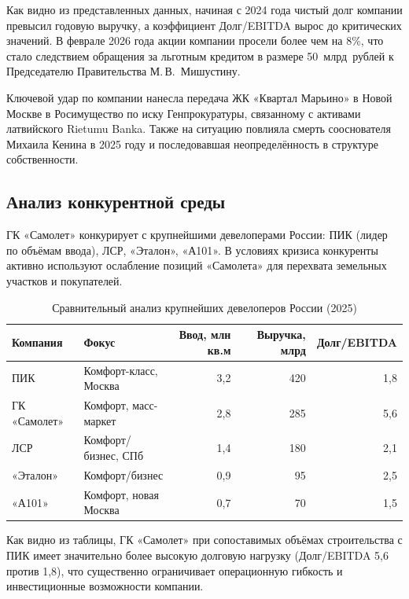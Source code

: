 \documentclass[12pt,a4paper]{article}
\begin{document}
Как видно из представленных данных, начиная с 2024 года чистый долг компании превысил годовую выручку, а коэффициент Долг/EBITDA вырос до критических значений. В феврале 2026 года акции компании просели более чем на 8\%, что стало следствием обращения за льготным кредитом в размере 50~млрд~рублей к Председателю Правительства М.\,В.~Мишустину.

Ключевой удар по компании нанесла передача ЖК «Квартал Марьино» в Новой Москве в Росимущество по иску Генпрокуратуры, связанному с активами латвийского Rietumu Banka. Также на ситуацию повлияла смерть сооснователя Михаила Кенина в 2025 году и последовавшая неопределённость в структуре собственности.

\subsection{Анализ конкурентной среды}

ГК «Самолет» конкурирует с крупнейшими девелоперами России: ПИК (лидер по объёмам ввода), ЛСР, «Эталон», «А101». В условиях кризиса конкуренты активно используют ослабление позиций «Самолета» для перехвата земельных участков и покупателей.

\begin{table}[H]
\centering
\caption{Сравнительный анализ крупнейших девелоперов России (2025)}
\label{tab:competitors}
\small
\begin{tabularx}{\textwidth}{|l|X|r|r|r|}
\hline
\rowcolor{samoletlight}
\textbf{Компания} & \textbf{Фокус} & \textbf{Ввод, млн кв.м} & \textbf{Выручка, млрд} & \textbf{Долг/EBITDA} \\
\hline
ПИК & Комфорт-класс, Москва & 3,2 & 420 & 1,8 \\
\hline
ГК «Самолет» & Комфорт, масс-маркет & 2,8 & 285 & 5,6 \\
\hline
ЛСР & Комфорт/бизнес, СПб & 1,4 & 180 & 2,1 \\
\hline
«Эталон» & Комфорт/бизнес & 0,9 & 95 & 2,5 \\
\hline
«А101» & Комфорт, новая Москва & 0,7 & 70 & 1,5 \\
\hline
\end{tabularx}
\end{table}

Как видно из таблицы, ГК «Самолет» при сопоставимых объёмах строительства с ПИК имеет значительно более высокую долговую нагрузку (Долг/EBITDA 5,6 против 1,8), что существенно ограничивает операционную гибкость и инвестиционные возможности компании.
\end{document}
